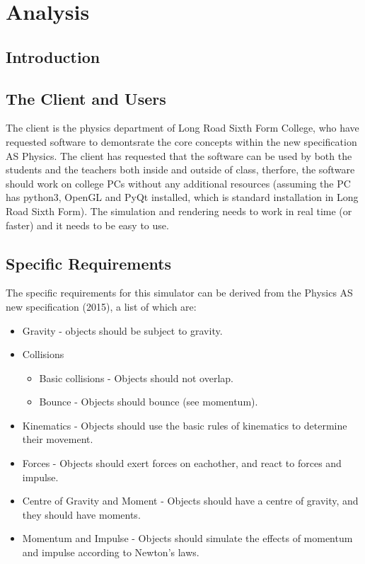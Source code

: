 \chapter{Analysis}

\section{Introduction}

\section{The Client and Users}
The client is the physics department of Long Road Sixth Form College, who have requested software to demontsrate the core concepts within the new specification AS Physics. The client has requested that the software can be used by both the students and the teachers both inside and outside of class, therfore, the software should work on college PCs without any additional resources (assuming the PC has python3, OpenGL and PyQt installed, which is standard installation in Long Road Sixth Form). The simulation and rendering needs to work in real time (or faster) and it needs to be easy to use.

\section{Specific Requirements}
The specific requirements for this simulator can be derived from the Physics AS new specification (2015), a list of which are:
\begin{itemize}
	\item Gravity  - objects should be subject to gravity.
	\item Collisions
	\begin{itemize}
		\item Basic collisions - Objects should not overlap.
		\item Bounce - Objects should bounce (see momentum).
	\end{itemize}
	\item Kinematics - Objects should use the basic rules of kinematics to determine their movement.
	\item Forces - Objects should exert forces on eachother, and react to forces and impulse.
	\item Centre of Gravity and Moment - Objects should have a centre of gravity, and they should have moments.
	\item Momentum and Impulse - Objects should simulate the effects of momentum and impulse according to Newton's laws.
\end{itemize}

